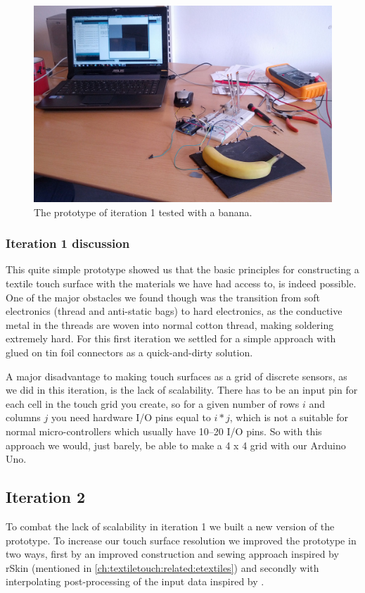 \begin{figure}[h]
  \centering
  \includegraphics[width=.9\textwidth]{figures/touch/banana-processing}
  \caption{The prototype of iteration 1 tested with a banana.}
  \label{fig:ch:touch:it1:banana}
\end{figure}

\subsubsection{Iteration 1 discussion}
This quite simple prototype showed us that the basic principles for constructing a textile touch surface with the materials we have had access to, is indeed possible.
One of the major obstacles we found though was the transition from soft electronics (thread and anti-static bags) to hard electronics, as the conductive metal in the threads are woven into normal cotton thread, making soldering extremely hard.
For this first iteration we settled for a simple approach with glued on tin foil connectors as a quick-and-dirty solution.

A major disadvantage to making touch surfaces as a grid of discrete sensors, as we did in this iteration, is the lack of scalability.
There has to be an input pin for each cell in the touch grid you create, so for a given number of rows \(i\) and columns \(j\) you need hardware I/O pins equal to \(i*j\), which is not a suitable for normal micro-controllers which usually have 10--20 I/O pins.
So with this approach we would, just barely, be able to make a 4 x 4 grid with our Arduino Uno. 

\subsection{Iteration 2}
\label{ch:textiletouch:it2}
To combat the lack of scalability in iteration 1 we built a new version of the prototype.
To increase our touch surface resolution we improved the prototype in two ways, first by an improved construction and sewing approach inspired by rSkin (mentioned in \ref{ch:textiletouch:related:etextiles}) and secondly with interpolating post-processing of the input data inspired by \citep{rosenberg2009unmousepad}. 

